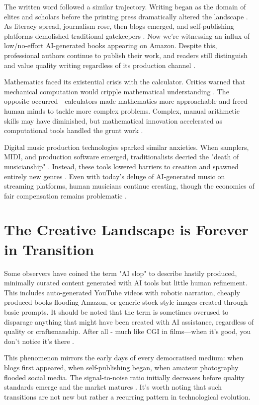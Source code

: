 \documentclass[12pt]{article}
\begin{document}
The written word followed a similar trajectory. Writing began as the domain of elites and scholars before the printing press dramatically altered the landscape \citep{eisenstein1980printing}. As literacy spread, journalism rose, then blogs emerged, and self-publishing platforms demolished traditional gatekeepers \citep{ong1982orality}. Now we're witnessing an influx of low/no-effort AI-generated books appearing on Amazon. Despite this, professional authors continue to publish their work, and readers still distinguish and value quality writing regardless of its production channel \citep{baron2015words}.

Mathematics faced its existential crisis with the calculator. Critics warned that mechanical computation would cripple mathematical understanding \citep{kidwell2008tools}. The opposite occurred—calculators made mathematics more approachable and freed human minds to tackle more complex problems. Complex, manual arithmetic skills may have diminished, but mathematical innovation accelerated as computational tools handled the grunt work \citep{kaput1992technology}.

Digital music production technologies sparked similar anxieties. When samplers, MIDI, and production software emerged, traditionalists decried the "death of musicianship" \citep{taylor2001strange}. Instead, these tools lowered barriers to creation and spawned entirely new genres \citep{theberge1997any}. Even with today's deluge of AI-generated music on streaming platforms, human musicians continue creating, though the economics of fair compensation remains problematic \citep{prior2018popular}.

\section{The Creative Landscape is Forever in Transition}

Some observers have coined the term "AI slop" to describe hastily produced, minimally curated content generated with AI tools but little human refinement. This includes auto-generated YouTube videos with robotic narration, cheaply produced books flooding Amazon, or generic stock-style images created through basic prompts. It should be noted that the term is sometimes overused to disparage anything that might have been created with AI assistance, regardless of quality or craftsmanship. After all - much like CGI in films—when it's good, you don't notice it's there \citep{floridi2014fourth}.

This phenomenon mirrors the early days of every democratised medium: when blogs first appeared, when self-publishing began, when amateur photography flooded social media. The signal-to-noise ratio initially decreases before quality standards emerge and the market matures \citep{andrejevic2013infoglut}. It's worth noting that such transitions are not new but rather a recurring pattern in technological evolution.
\end{document}
